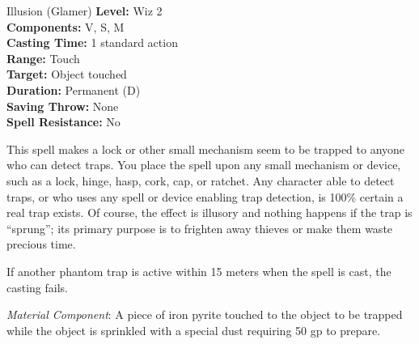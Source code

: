 {Illusion (Glamer)}
{
	\textbf{Level:}
	Wiz 2\\
	\textbf{Components:}
	V, S, M\\
	\textbf{Casting Time:}
	1 standard action\\
	\textbf{Range:}
	Touch\\
	\textbf{Target:}
	Object touched\\
	\textbf{Duration:}
	Permanent (D)\\
	\textbf{Saving Throw:}
	None\\
	\textbf{Spell Resistance:}
	No\\
}
{
	This spell makes a lock or other small mechanism seem to be trapped to anyone who can detect traps. You place the spell upon any small mechanism or device, such as a lock, hinge, hasp, cork, cap, or ratchet. Any character able to detect traps, or who uses any spell or device enabling trap detection, is 100\% certain a real trap exists. Of course, the effect is illusory and nothing happens if the trap is ``sprung''; its primary purpose is to frighten away thieves or make them waste precious time.

	If another phantom trap is active within 15 meters when the spell is cast, the casting fails.

	\textit{Material Component}:
	A piece of iron pyrite touched to the object to be trapped while the object is sprinkled with a special dust requiring 50 gp to prepare.

}
